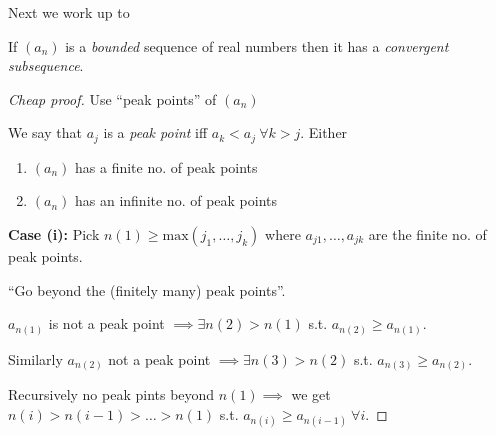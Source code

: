 \documentclass[twoside]{scrartcl}
\begin{document}
Next we work up to 


\begin{theorem}
If $(a_n)$ is a \emph{bounded} sequence of real numbers then it has a \emph{convergent subsequence}.
\end{theorem}


\begin{proof}[Cheap proof]

Use ``peak points'' of $(a_n)$
\begin{center}
\end{center}

We say that $a_j$ is a \emph{peak point} iff $a_k < a_j ~\forall k > j$.
Either
\begin{enumerate}
	\item $(a_n)$ has a finite no. of peak points
	\item $(a_n)$ has an infinite no. of peak points
\end{enumerate}

\textbf{Case (i):} Pick $n(1) \geq \mathrm{max}(j_1,\dots,j_k)$ where $a_{j1},\dots,a_{jk}$ are the finite no. of peak points. 

``Go beyond the (finitely many) peak points''.

$a_{n(1)}$ is not a peak point $\implies \exists n(2) > n(1)$ s.t. $a_{n(2)} \geq a_{n(1)}$. 

Similarly $a_{n(2)}$ not a peak point $\implies \exists n(3) > n(2)$ s.t. $a_{n(3)} \geq a_{n(2)}$.

Recursively no peak pints beyond $n(1) \implies$ we get $n(i) > n(i-1) > \dots > n(1)$ s.t. $a_{n(i)} \geq a_{n(i-1)}~\forall i$.


\end{proof}
\end{document}
